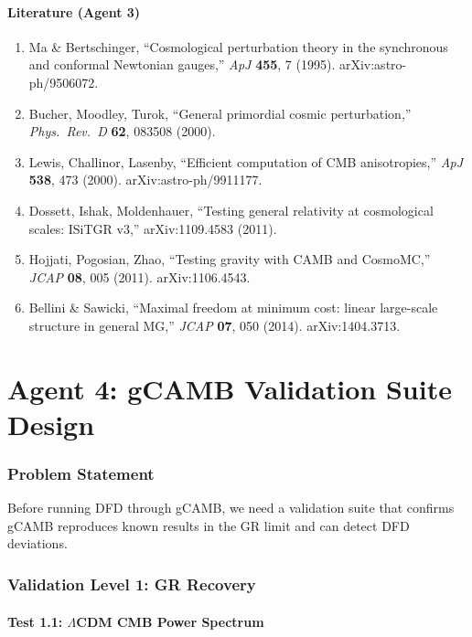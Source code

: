 \documentclass[11pt,a4paper]{article}
\begin{document}
\subsection{Literature (Agent 3)}

\begin{enumerate}
\item Ma \& Bertschinger, ``Cosmological perturbation theory in the synchronous and conformal Newtonian gauges,'' \textit{ApJ} \textbf{455}, 7 (1995). arXiv:astro-ph/9506072.
\item Bucher, Moodley, Turok, ``General primordial cosmic perturbation,'' \textit{Phys.\ Rev.\ D} \textbf{62}, 083508 (2000).
\item Lewis, Challinor, Lasenby, ``Efficient computation of CMB anisotropies,'' \textit{ApJ} \textbf{538}, 473 (2000). arXiv:astro-ph/9911177.
\item Dossett, Ishak, Moldenhauer, ``Testing general relativity at cosmological scales: ISiTGR v3,'' arXiv:1109.4583 (2011).
\item Hojjati, Pogosian, Zhao, ``Testing gravity with CAMB and CosmoMC,'' \textit{JCAP} \textbf{08}, 005 (2011). arXiv:1106.4543.
\item Bellini \& Sawicki, ``Maximal freedom at minimum cost: linear large-scale structure in general MG,'' \textit{JCAP} \textbf{07}, 050 (2014). arXiv:1404.3713.
\end{enumerate}


\part{Agent 4: gCAMB Validation Suite Design}
\label{part:validation}

\section{Problem Statement}

Before running DFD through gCAMB, we need a validation suite that confirms gCAMB reproduces known results in the GR limit and can detect DFD deviations.

\section{Validation Level 1: GR Recovery}

\subsection{Test 1.1: $\Lambda$CDM CMB Power Spectrum}
\end{document}
